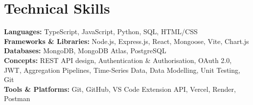 \documentclass[11pt,a4paper]{article}
\begin{document}

\section*{Technical Skills}

\textbf{Languages:} TypeScript, JavaScript, Python, SQL, HTML/CSS\\
\textbf{Frameworks \& Libraries:} Node.js, Express.js, React, Mongoose, Vite, Chart.js\\
\textbf{Databases:} MongoDB, MongoDB Atlas, PostgreSQL\\
\textbf{Concepts:} REST API design, Authentication \& Authorisation, OAuth 2.0, JWT,
  Aggregation Pipelines, Time-Series Data, Data Modelling, Unit Testing, Git\\
\textbf{Tools \& Platforms:} Git, GitHub, VS Code Extension API, Vercel, Render, Postman
\end{document}
